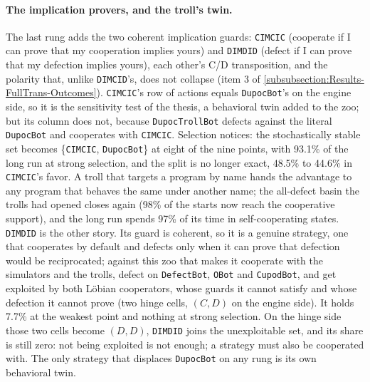 \paragraph{The implication provers, and the troll's twin.} The last rung adds the two coherent implication guards: \texttt{CIMCIC} (cooperate if I can prove that my cooperation implies yours) and \texttt{DIMDID} (defect if I can prove that my defection implies yours), each other's C/D transposition, and the polarity that, unlike \texttt{DIMCID}'s, does not collapse (item 3 of \cref{subsubsection:Results-FullTrans-Outcomes}). \texttt{CIMCIC}'s row of actions equals \texttt{DupocBot}'s on the engine side, so it is the sensitivity test of the thesis, a behavioral twin added to the zoo; but its column does not, because \texttt{DupocTrollBot} defects against the literal \texttt{DupocBot} and cooperates with \texttt{CIMCIC}. Selection notices: the stochastically stable set becomes \{\texttt{CIMCIC}, \texttt{DupocBot}\} at eight of the nine points, with 93.1\% of the long run at strong selection, and the split is no longer exact, 48.5\% to 44.6\% in \texttt{CIMCIC}'s favor. A troll that targets a program by name hands the advantage to any program that behaves the same under another name; the all-defect basin the trolls had opened closes again (98\% of the starts now reach the cooperative support), and the long run spends 97\% of its time in self-cooperating states. \texttt{DIMDID} is the other story. Its guard is coherent, so it is a genuine strategy, one that cooperates by default and defects only when it can prove that defection would be reciprocated; against this zoo that makes it cooperate with the simulators and the trolls, defect on \texttt{DefectBot}, \texttt{OBot} and \texttt{CupodBot}, and get exploited by both Löbian cooperators, whose guards it cannot satisfy and whose defection it cannot prove (two hinge cells, $(C,D)$ on the engine side). It holds 7.7\% at the weakest point and nothing at strong selection. On the hinge side those two cells become $(D,D)$, \texttt{DIMDID} joins the unexploitable set, and its share is still zero: not being exploited is not enough; a strategy must also be cooperated with. The only strategy that displaces \texttt{DupocBot} on any rung is its own behavioral twin.
